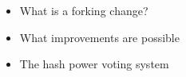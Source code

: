 \begin{itemize} \item What is a forking change?  \item What improvements are
possible \item The hash power voting system \end{itemize}


%
%



%
%


